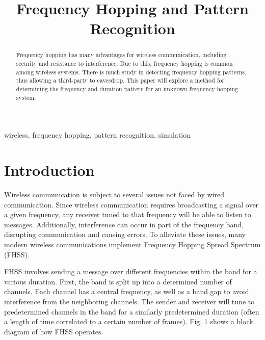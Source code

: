 \documentclass[conference]{IEEEtran}
\begin{document}
\title{Frequency Hopping and Pattern Recognition}

\author{
}

\maketitle

\begin{abstract}
Frequency hopping has many advantages for wireless communication, including security and resistance to interference.
Due to this, frequency hopping is common among wireless systems.
There is much study in detecting frequency hopping patterns, thus allowing a third-party to eavesdrop.
This paper will explore a method for determining the frequency and duration pattern for an unknown frequency hopping system.
\end{abstract}

\begin{IEEEkeywords}
wireless, frequency hopping, pattern recognition, simulation
\end{IEEEkeywords}

\section{Introduction}

Wireless communication is subject to several issues not faced by wired communication.
Since wireless communication requires broadcasting a signal over a given frequency, any receiver tuned to that frequency will be able to listen to messages.
Additionally, interference can occur in part of the frequency band, disrupting communication and causing errors.
To alleviate these issues, many modern wireless communications implement Frequency Hopping Spread Spectrum (FHSS).

FHSS involves sending a message over different frequencies within the band for a various duration.
First, the band is split up into a determined number of channels.
Each channel has a central frequency, as well as a band gap to avoid interference from the neighboring channels.
The sender and receiver will tune to predetermined channels in the band for a similarly predetermined duration (often a length of time correlated to a certain number of frames).
Fig. 1 shows a block diagram of how FHSS operates.
\end{document}
